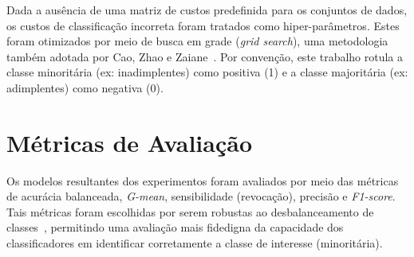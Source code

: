 Dada a ausência de uma matriz de custos predefinida para os conjuntos de dados, os custos de classificação incorreta foram tratados como hiper-parâmetros. Estes foram otimizados por meio de busca em grade (\textit{grid search}), uma metodologia também adotada por Cao, Zhao e Zaiane~\cite{Cao2013}. Por convenção, este trabalho rotula a classe minoritária (ex: inadimplentes) como positiva (1) e a classe majoritária (ex: adimplentes) como negativa (0).

\section{Métricas de Avaliação}\label{sec:metricas}

Os modelos resultantes dos experimentos foram avaliados por meio das métricas de acurácia balanceada, \textit{G-mean}, sensibilidade (revocação), precisão e \textit{F1-score}. Tais métricas foram escolhidas por serem robustas ao desbalanceamento de classes~\cite{Namvar2018,Wei2025}, permitindo uma avaliação mais fidedigna da capacidade dos classificadores em identificar corretamente a classe de interesse (minoritária).